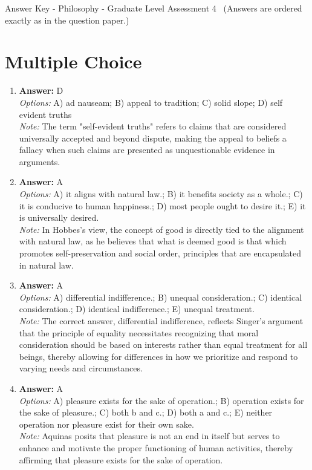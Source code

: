 \documentclass[12pt]{article}
\begin{document}
\begin{center}
Answer Key - Philosophy - Graduate Level Assessment 4 \
\small (Answers are ordered exactly as in the question paper.)
\end{center}

\section*{Multiple Choice}
\begin{enumerate}[label=\arabic*.]
\item \textbf{Answer:} D
\\ \textit{Options:} A) ad nauseam; B) appeal to tradition; C) solid slope; D) self evident truths
\\ \textit{Note:} The term "self-evident truths" refers to claims that are considered universally accepted and beyond dispute, making the appeal to beliefs a fallacy when such claims are presented as unquestionable evidence in arguments.
\item \textbf{Answer:} A
\\ \textit{Options:} A) it aligns with natural law.; B) it benefits society as a whole.; C) it is conducive to human happiness.; D) most people ought to desire it.; E) it is universally desired.
\\ \textit{Note:} In Hobbes's view, the concept of good is directly tied to the alignment with natural law, as he believes that what is deemed good is that which promotes self-preservation and social order, principles that are encapsulated in natural law.
\item \textbf{Answer:} A
\\ \textit{Options:} A) differential indifference.; B) unequal consideration.; C) identical consideration.; D) identical indifference.; E) unequal treatment.
\\ \textit{Note:} The correct answer, differential indifference, reflects Singer's argument that the principle of equality necessitates recognizing that moral consideration should be based on interests rather than equal treatment for all beings, thereby allowing for differences in how we prioritize and respond to varying needs and circumstances.
\item \textbf{Answer:} A
\\ \textit{Options:} A) pleasure exists for the sake of operation.; B) operation exists for the sake of pleasure.; C) both b and c.; D) both a and c.; E) neither operation nor pleasure exist for their own sake.
\\ \textit{Note:} Aquinas posits that pleasure is not an end in itself but serves to enhance and motivate the proper functioning of human activities, thereby affirming that pleasure exists for the sake of operation.

\end{enumerate}
\end{document}
